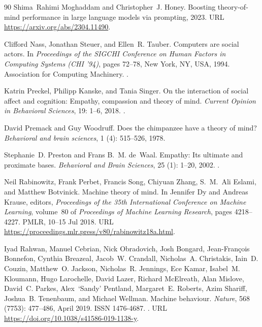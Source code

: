\begin{thebibliography}{90}
Shima~Rahimi Moghaddam and Christopher~J. Honey.
\newblock Boosting theory-of-mind performance in large language models via prompting, 2023.
\newblock URL \url{https://arxiv.org/abs/2304.11490}.

Clifford Nass, Jonathan Steuer, and Ellen~R. Tauber.
\newblock Computers are social actors.
\newblock In \emph{Proceedings of the SIGCHI Conference on Human Factors in Computing Systems (CHI '94)}, pages 72--78, New York, NY, USA, 1994. Association for Computing Machinery.
\newblock {}.

Katrin Preckel, Philipp Kanske, and Tania Singer.
\newblock On the interaction of social affect and cognition: Empathy, compassion and theory of mind.
\newblock \emph{Current Opinion in Behavioral Sciences}, 19: 1--6, 2018.
\newblock {}.

David Premack and Guy Woodruff.
\newblock Does the chimpanzee have a theory of mind?
\newblock \emph{Behavioral and brain sciences}, 1 (4): 515--526, 1978.

Stephanie~D. Preston and Frans B.~M. de~Waal.
\newblock Empathy: Its ultimate and proximate bases.
\newblock \emph{Behavioral and Brain Sciences}, 25 (1): 1--20, 2002.
\newblock {}.

Neil Rabinowitz, Frank Perbet, Francis Song, Chiyuan Zhang, S.~M.~Ali Eslami, and Matthew Botvinick.
\newblock Machine theory of mind.
\newblock In Jennifer Dy and Andreas Krause, editors, \emph{Proceedings of the 35th International Conference on Machine Learning}, volume~80 of \emph{Proceedings of Machine Learning Research}, pages 4218--4227. PMLR, 10--15 Jul 2018.
\newblock URL \url{https://proceedings.mlr.press/v80/rabinowitz18a.html}.

Iyad Rahwan, Manuel Cebrian, Nick Obradovich, Josh Bongard, Jean-François Bonnefon, Cynthia Breazeal, Jacob~W. Crandall, Nicholas~A. Christakis, Iain~D. Couzin, Matthew~O. Jackson, Nicholas~R. Jennings, Ece Kamar, Isabel~M. Kloumann, Hugo Larochelle, David Lazer, Richard McElreath, Alan Mislove, David~C. Parkes, Alex~‘Sandy’ Pentland, Margaret~E. Roberts, Azim Shariff, Joshua~B. Tenenbaum, and Michael Wellman.
\newblock Machine behaviour.
\newblock \emph{Nature}, 568 (7753): 477--486, April 2019.
\newblock ISSN 1476-4687.
\newblock {}.
\newblock URL \url{https://doi.org/10.1038/s41586-019-1138-y}.


\end{thebibliography}
